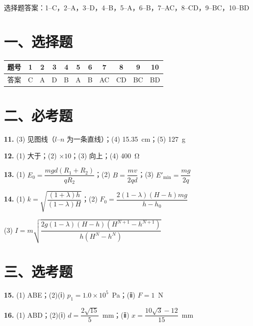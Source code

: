 
\begin{gknotice}
  选择题答案：1--C，2--A，3--D，4--B，5--A，6--B，7--AC，8--CD，9--BC，10--BD
\end{gknotice}

\section*{一、选择题}

\noindent
\begin{tabular}{@{}lcccccccccc@{}}
\toprule
题号 & 1 & 2 & 3 & 4 & 5 & 6 & 7 & 8 & 9 & 10\\
\midrule
答案 & C & A & D & B & A & B & AC & CD & BC & BD\\
\bottomrule
\end{tabular}

\section*{二、必考题}

\noindent
\textbf{11.} (3) 见图线（$l$--$n$ 为一条直线）；\quad(4) 15.35~cm；\quad(5) 127~g

\smallskip

\noindent
\textbf{12.} (1) 大于；\quad(2) $\times 10$；\quad(3) 向上；\quad(4) 400~\si{\ohm}

\smallskip

\noindent
\textbf{13.} (1) $E_{0}=\dfrac{mgd(R_{1}+R_{2})}{qR_{2}}$；\quad(2) $B=\dfrac{mv}{2qd}$；\quad(3) $E'_{\min}=\dfrac{mg}{2q}$

\smallskip

\noindent
\textbf{14.} (1) $k=\sqrt{\dfrac{(1+\lambda)h}{(1-\lambda)H}}$；\quad(2) $F_{0}=\dfrac{2(1-\lambda)(H-h)mg}{h-h_{0}}$

\smallskip

\noindent
(3) $I=m\sqrt{\dfrac{2g(1-\lambda)(H-h)(H^{N+1}-h^{N+1})}{h(H^{N}-h^{N})}}$

\section*{三、选考题}

\noindent
\textbf{15.} (1) ABE；\quad(2)(ⅰ) $p_{1}=1.0\times10^{5}$~Pa；\quad(ⅱ) $F=1$~N

\smallskip

\noindent
\textbf{16.} (1) ABD；\quad(2)(ⅰ) $d=\dfrac{2\sqrt{15}}{5}$~mm；\quad(ⅱ) $x=\dfrac{10\sqrt{3}-12}{15}$~mm
